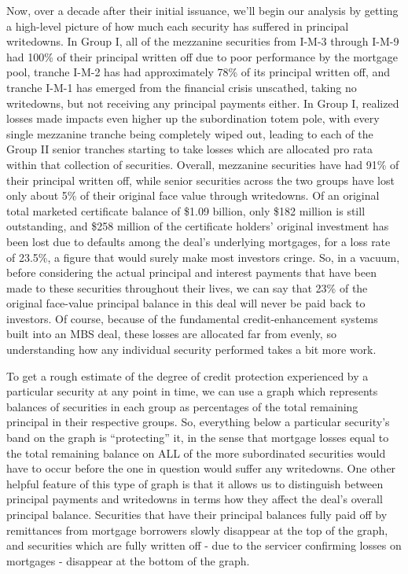 \documentclass[12pt]{article}
\begin{document}
Now, over a decade after their initial issuance, we’ll begin our analysis by getting a high-level picture of how much each security has suffered in principal writedowns. In Group I, all of the mezzanine securities from I-M-3 through I-M-9 had 100\% of their principal written off due to poor performance by the mortgage pool, tranche I-M-2 has had approximately 78\% of its principal written off, and tranche I-M-1 has emerged from the financial crisis unscathed, taking no writedowns, but not receiving any principal payments either. In Group I, realized losses made impacts even higher up the subordination totem pole, with every single mezzanine tranche being completely wiped out, leading to each of the Group II senior tranches starting to take losses which are allocated pro rata within that collection of securities. Overall, mezzanine securities have had 91\% of their principal written off, while senior securities across the two groups have lost only about 5\% of their original face value through writedowns. Of an original total marketed certificate balance of \$1.09 billion, only \$182 million is still outstanding, and \$258 million of the certificate holders’ original investment has been lost due to defaults among the deal’s underlying mortgages, for a loss rate of 23.5\%, a figure that would surely make most investors cringe. So, in a vacuum, before considering the actual principal and interest payments that have been made to these securities throughout their lives, we can say that 23\% of the original face-value principal balance in this deal will never be paid back to investors. Of course, because of the fundamental credit-enhancement systems built into an MBS deal, these losses are allocated far from evenly, so understanding how any individual security performed takes a bit more work.

To get a rough estimate of the degree of credit protection experienced by a particular security at any point in time, we can use a graph which represents balances of securities in each group as percentages of the total remaining principal in their respective groups. So, everything below a particular security’s band on the graph is “protecting” it, in the sense that mortgage losses equal to the total remaining balance on ALL of the more subordinated securities would have to occur before the one in question would suffer any writedowns. One other helpful feature of this type of graph is that it allows us to distinguish between principal payments and writedowns in terms how they affect the deal’s overall principal balance. Securities that have their principal balances fully paid off by remittances from mortgage borrowers slowly disappear at the top of the graph, and securities which are fully written off - due to the servicer confirming losses on mortgages - disappear at the bottom of the graph.
\end{document}
